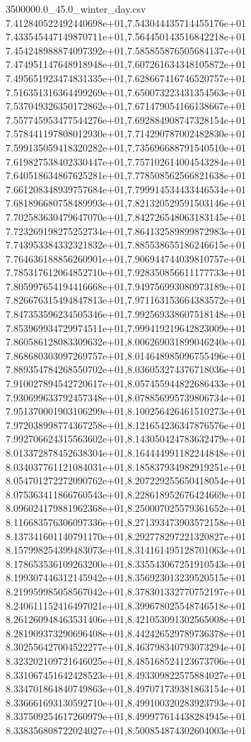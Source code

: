 \begin{filecontents*}{3500000.0_45.0_winter_day.csv}
7.412840522492440698e+01,7.543044435714455176e+01
7.433545447149870711e+01,7.564450143516842218e+01
7.454248988874097392e+01,7.585855876505684137e+01
7.474951147648918948e+01,7.607261634348105872e+01
7.495651923474831335e+01,7.628667416746520757e+01
7.516351316364499269e+01,7.650073223431354563e+01
7.537049326350172862e+01,7.671479054166138667e+01
7.557745953477544276e+01,7.692884908747328154e+01
7.578441197808012930e+01,7.714290787002482830e+01
7.599135059418320282e+01,7.735696688791540510e+01
7.619827538402330447e+01,7.757102614004543284e+01
7.640518634867625281e+01,7.778508562566821638e+01
7.661208348939757684e+01,7.799914534433446534e+01
7.681896680758489993e+01,7.821320529591503146e+01
7.702583630479647070e+01,7.842726548063183145e+01
7.723269198275252734e+01,7.864132589899872983e+01
7.743953384332321832e+01,7.885538655186246615e+01
7.764636188856260901e+01,7.906944744039810757e+01
7.785317612064852710e+01,7.928350856611177733e+01
7.805997654194416668e+01,7.949756993080973189e+01
7.826676315494847813e+01,7.971163153664383572e+01
7.847353596234505346e+01,7.992569338607518148e+01
7.853969934729974511e+01,7.999419219642823009e+01
7.860586128083309632e+01,8.006269031899046240e+01
7.868680303097269757e+01,8.014648985096755496e+01
7.889354784268550702e+01,8.036053274376718036e+01
7.910027894542720617e+01,8.057455944822686433e+01
7.930699633792457348e+01,8.078856995739806734e+01
7.951370001903106299e+01,8.100256426461510273e+01
7.972038998774367258e+01,8.121654236347876576e+01
7.992706624315563602e+01,8.143050424783632479e+01
8.013372878452638304e+01,8.164444991182244848e+01
8.034037761121084031e+01,8.185837934982919251e+01
8.054701272272090762e+01,8.207229255650418054e+01
8.075363411866760543e+01,8.228618952676424669e+01
8.096024179881962368e+01,8.250007025579361652e+01
8.116683576306097336e+01,8.271393473903572158e+01
8.137341601140791170e+01,8.292778297221320827e+01
8.157998254399483073e+01,8.314161495128701063e+01
8.178653536109263200e+01,8.335543067251910543e+01
8.199307446312145942e+01,8.356923013239520515e+01
8.219959985058567042e+01,8.378301332770752197e+01
8.240611152416497021e+01,8.399678025548746518e+01
8.261260948463531406e+01,8.421053091302565008e+01
8.281909373290696408e+01,8.442426529789736378e+01
8.302556427004522277e+01,8.463798340793073294e+01
8.323202109721646025e+01,8.485168524123673706e+01
8.331067451642428523e+01,8.493309822575884027e+01
8.334701864840749863e+01,8.497071739381863154e+01
8.336661693130592710e+01,8.499100320283923793e+01
8.337509254617260979e+01,8.499977614438284945e+01
8.338356808722024027e+01,8.500854874302604003e+01

\end{filecontents*}
